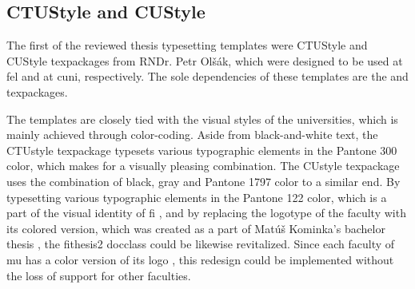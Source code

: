     \subsection{CTUStyle and CUStyle}\label{sec:ctu&custyle}
    The first of the reviewed thesis typesetting templates were CTUStyle \cite{ctustyle} and CUStyle \cite{custyle} \glspl{texpackage} from RNDr. Petr Olšák, which were designed to be used at \gls{fel} and at \gls{cuni}, respectively. The sole dependencies of these templates are the  and  \glspl{texpackage}.

    The templates are closely tied with the visual styles of the universities, which is mainly achieved through color-coding. Aside from black-and-white text, the CTUstyle \gls{texpackage} typesets various typographic elements in the  Pantone 300 color, which makes for a visually pleasing combination. The CUstyle \gls{texpackage} uses the combination of black, gray and  Pantone 1797 color to a similar end. By typesetting various typographic elements in the  Pantone 122 color, which is a part of the visual identity of \gls{fi} \cite{filogo}, and by replacing the logotype of the faculty with its colored version, which was created as a part of Matúš Kominka's bachelor thesis \cite{Kominka08}, the fithesis2 \gls{docclass} could be likewise revitalized.   Since each faculty of \gls{mu} has a color version of its logo \cite{muvis}, this redesign could be implemented without the loss of support for other faculties. 

